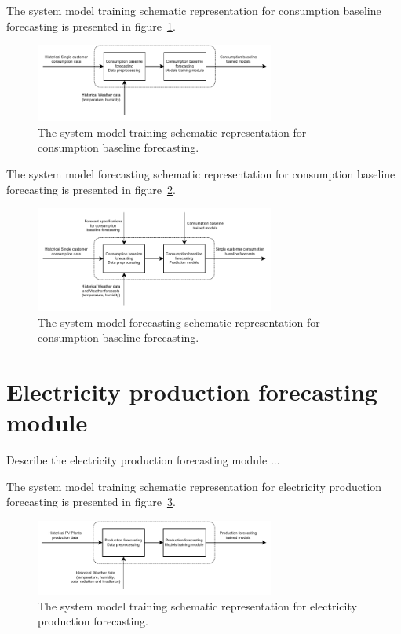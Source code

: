 The system model training schematic representation for consumption baseline forecasting is presented in figure~\ref{fig:modeltrainingbaseline}.

\begin{figure}[H]
\centering
\includegraphics[width=0.7\textwidth]{images/system_model_training_baseline}
\caption{The system model training schematic representation for consumption baseline forecasting.}
\label{fig:modeltrainingbaseline}
\end{figure}

The system model forecasting schematic representation for consumption baseline forecasting is presented in figure~\ref{fig:modelforecastingbaseline}.

\begin{figure}[H]
\centering
\includegraphics[width=0.7\textwidth]{images/system_model_forecasting_baseline}
\caption{The system model forecasting schematic representation for consumption baseline forecasting.}
\label{fig:modelforecastingbaseline}
\end{figure}


\section{Electricity production forecasting module}
\label{sec:productionmodel}
\vspace{0.2 cm}

Describe the electricity production forecasting module ...

The system model training schematic representation for electricity production forecasting is presented in figure~\ref{fig:modeltrainingproduction}.

\begin{figure}[H]
\centering
\includegraphics[width=0.7\textwidth]{images/system_model_training_production}
\caption{The system model training schematic representation for electricity production forecasting.}
\label{fig:modeltrainingproduction}
\end{figure}

